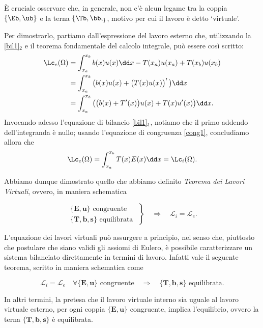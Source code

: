 È cruciale osservare che, in generale, non c'è  alcun legame tra la coppia $\{\Eb, \ub\}$ e la terna $\{\Tb, \bb, \sb\}$, motivo per cui il lavoro è detto `virtuale'.

Per dimostrarlo, partiamo dall'espressione del lavoro esterno che, utilizzando la \eqref{bil1}$_2$ e il teorema fondamentale del calcolo integrale, può essere così scritto:
\begin{equation}
\begin{aligned}
\Lc_e(\Omega)&=\int_{x_a}^{x_b}b(x)u(x)\dd x-T(x_a)u(x_a)+T(x_b)u(x_b)\\
&=\int_{x_a}^{x_b}\big( b(x)u(x)+ \big(T(x)u(x)\big)' \,\big)\dd x\\
&=\int_{x_a}^{x_b}\big(\big(b(x)+T'(x)\big) u(x)+T(x)u'(x)\big) \dd x.
\end{aligned}
\end{equation}
Invocando adesso l'equazione di bilancio \eqref{bil1}$_1$, notiamo che il primo addendo dell'integranda è nullo; usando l'equazione di congruenza  \eqref{cong1}, concludiamo allora che 
\begin{equation}
\begin{aligned}
	\Lc_e(\Omega)=\int_{x_a}^{x_b}T(x) E(x)\dd x=	\Lc_i(\Omega).
\end{aligned}
\end{equation}

Abbiamo dunque dimostrato quello che abbiamo definito \textit{Teorema dei Lavori Virtuali}, ovvero, in maniera schematica
\begin{definition}
	\begin{equation}
	\left.\begin{array}{rr}\{\mathbf{E},\mathbf{u}\}\text{ congruente }\\\{\mathbf{T},\mathbf{b},\mathbf{s}\}\text{ equilibrata }\end{array}\right\}\quad\Longrightarrow\quad\mathcal{L}_i=\mathcal{L}_e.
\end{equation}
\end{definition}

L'equazione dei lavori virtuali può assurgere a principio, nel senso che, piuttosto che postulare che siano validi gli assiomi di Eulero, è possibile caratterizzare un sistema bilanciato direttamente in termini di lavoro. Infatti vale il seguente teorema, scritto in maniera schematica come 
\begin{definition}
	\begin{equation}
	\mathcal{L}_i=\mathcal{L}_e\quad\forall\{\mathbf{E},\mathbf{u}\}\text{ congruente}\quad\Longrightarrow\quad\{\mathbf{T},\mathbf{b},\mathbf{s}\}\text{ equilibrata.}
\end{equation}
\end{definition}
In altri termini, la pretesa che il lavoro virtuale interno sia uguale al lavoro virtuale esterno, per ogni coppia $\{\mathbf{E},\mathbf{u}\}$ congruente,  implica l'equilibrio, ovvero la terna $\{\mathbf{T},\mathbf{b},\mathbf{s}\}$ è equilibrata.

